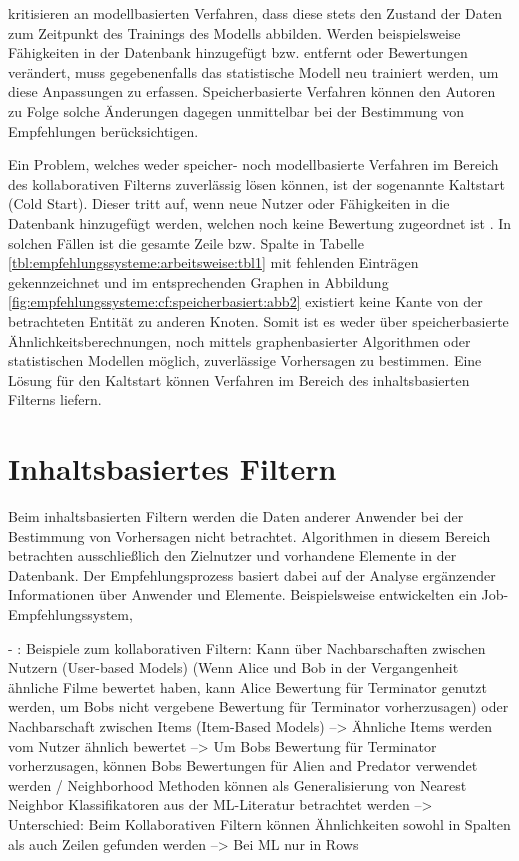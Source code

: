 \textcite[S. 1f.]{pennock:2000} kritisieren an modellbasierten Verfahren, dass diese stets den Zustand der Daten zum Zeitpunkt des Trainings des Modells abbilden. Werden beispielsweise Fähigkeiten in der Datenbank hinzugefügt bzw. entfernt oder Bewertungen verändert, muss gegebenenfalls das statistische Modell neu trainiert werden, um diese Anpassungen zu erfassen. Speicherbasierte Verfahren können den Autoren zu Folge solche Änderungen dagegen unmittelbar bei der Bestimmung von Empfehlungen berücksichtigen.

Ein Problem, welches weder speicher- noch modellbasierte Verfahren im Bereich des kollaborativen Filterns zuverlässig lösen können, ist der sogenannte Kaltstart (Cold Start). Dieser tritt auf, wenn neue Nutzer oder Fähigkeiten in die Datenbank hinzugefügt werden, welchen noch keine Bewertung zugeordnet ist \cite[S. 5]{huang:2004}. In solchen Fällen ist die gesamte Zeile bzw. Spalte in Tabelle \ref{tbl:empfehlungssysteme:arbeitsweise:tbl1} mit fehlenden Einträgen gekennzeichnet und im entsprechenden Graphen in Abbildung \ref{fig:empfehlungssysteme:cf:speicherbasiert:abb2} existiert keine Kante von der betrachteten Entität zu anderen Knoten. Somit ist es weder über speicherbasierte Ähnlichkeitsberechnungen, noch mittels graphenbasierter Algorithmen oder statistischen Modellen möglich, zuverlässige Vorhersagen zu bestimmen. Eine Lösung für den Kaltstart können Verfahren im Bereich des inhaltsbasierten Filterns liefern.

\section{Inhaltsbasiertes Filtern}
\label{ch:empfehlungssysteme:inhaltsbasiertesFiltern}
Beim inhaltsbasierten Filtern werden die Daten anderer Anwender bei der Bestimmung von Vorhersagen nicht betrachtet. Algorithmen in diesem Bereich betrachten ausschließlich den Zielnutzer und vorhandene Elemente in der Datenbank. Der Empfehlungsprozess basiert dabei auf der Analyse ergänzender Informationen über Anwender und Elemente. Beispielsweise entwickelten \textcite{guo:2016} ein Job-Empfehlungssystem, 

\newpage

- \cite[S. 33]{recommenderSystems:2016}: Beispiele zum kollaborativen Filtern: Kann über Nachbarschaften zwischen Nutzern (User-based Models) (Wenn Alice und Bob in der Vergangenheit ähnliche Filme bewertet haben, kann Alice Bewertung für Terminator genutzt werden, um Bobs nicht vergebene Bewertung für Terminator vorherzusagen) oder Nachbarschaft zwischen Items (Item-Based Models) --> Ähnliche Items werden vom Nutzer ähnlich bewertet --> Um Bobs Bewertung für Terminator vorherzusagen, können Bobs Bewertungen für Alien and Predator verwendet werden / Neighborhood Methoden können als Generalisierung von Nearest Neighbor Klassifikatoren aus der ML-Literatur betrachtet werden --> Unterschied: Beim Kollaborativen Filtern können Ähnlichkeiten sowohl in Spalten als auch Zeilen gefunden werden --> Bei ML nur in Rows

